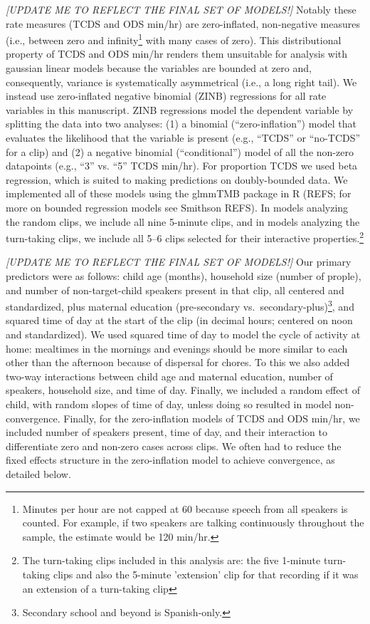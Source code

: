 \documentclass[floatsintext,man]{apa6}
\theoremstyle{definition}
\theoremstyle{definition}
\theoremstyle{definition}
\theoremstyle{remark}
\begin{document}
\emph{{[}UPDATE ME TO REFLECT THE FINAL SET OF MODELS!{]}} Notably these
rate measures (TCDS and ODS min/hr) are zero-inflated, non-negative
measures (i.e., between zero and
infinity\footnote{Minutes per hour are not capped at 60 because speech from all speakers is counted. For example, if two speakers are talking continuously throughout the sample, the estimate would be 120 min/hr.}
with many cases of zero). This distributional property of TCDS and ODS
min/hr renders them unsuitable for analysis with gaussian linear models
because the variables are bounded at zero and, consequently, variance is
systematically asymmetrical (i.e., a long right tail). We instead use
zero-inflated negative binomial (ZINB) regressions for all rate
variables in this manuscript. ZINB regressions model the dependent
variable by splitting the data into two analyses: (1) a binomial
(\enquote{zero-inflation}) model that evaluates the likelihood that the
variable is present (e.g., \enquote{TCDS} or \enquote{no-TCDS} for a
clip) and (2) a negative binomial (\enquote{conditional}) model of all
the non-zero datapoints (e.g., \enquote{3} vs. \enquote{5} TCDS min/hr).
For proportion TCDS we used beta regression, which is suited to making
predictions on doubly-bounded data. We implemented all of these models
using the glmmTMB package in R (REFS; for more on bounded regression
models see Smithson REFS). In models analyzing the random clips, we
include all nine 5-minute clips, and in models analyzing the turn-taking
clips, we include all 5--6 clips selected for their interactive
properties.\footnote{The turn-taking clips included in this analysis are: the five 1-minute turn-taking clips and also the 5-minute 'extension' clip for that recording if it was an extension of a turn-taking clip}

\emph{{[}UPDATE ME TO REFLECT THE FINAL SET OF MODELS!{]}} Our primary
predictors were as follows: child age (months), household size (number
of prople), and number of non-target-child speakers present in that
clip, all centered and standardized, plus maternal education
(pre-secondary
vs.~secondary-plus)\footnote{Secondary school and beyond is Spanish-only.},
and squared time of day at the start of the clip (in decimal hours;
centered on noon and standardized). We used squared time of day to model
the cycle of activity at home: mealtimes in the mornings and evenings
should be more similar to each other than the afternoon because of
dispersal for chores. To this we also added two-way interactions between
child age and maternal education, number of speakers, household size,
and time of day. Finally, we included a random effect of child, with
random slopes of time of day, unless doing so resulted in model
non-convergence. Finally, for the zero-inflation models of TCDS and ODS
min/hr, we included number of speakers present, time of day, and their
interaction to differentiate zero and non-zero cases across clips. We
often had to reduce the fixed effects structure in the zero-inflation
model to achieve convergence, as detailed below.
\end{document}
